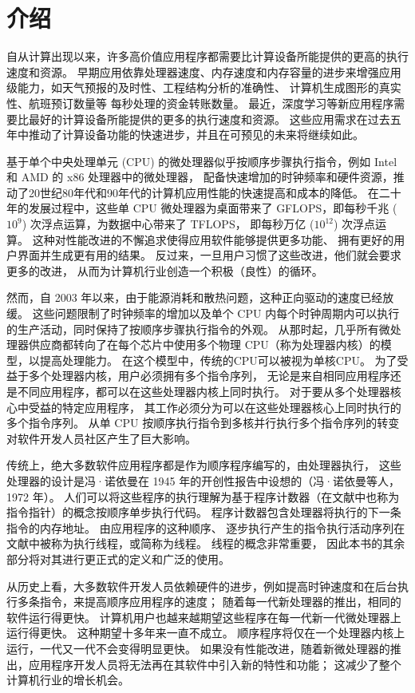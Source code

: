 \section{介绍}

自从计算出现以来，许多高价值应用程序都需要比计算设备所能提供的更高的执行速度和资源。 
早期应用依靠处理器速度、内存速度和内存容量的进步来增强应用级能力，如天气预报的及时性、工程结构分析的准确性、
计算机生成图形的真实性、航班预订数量等 每秒处理的资金转账数量。 
最近，深度学习等新应用程序需要比最好的计算设备所能提供的更多的执行速度和资源。 
这些应用需求在过去五年中推动了计算设备功能的快速进步，并且在可预见的未来将继续如此。

基于单个中央处理单元 (CPU) 的微处理器似乎按顺序步骤执行指令，例如 Intel 和 AMD 的 x86 处理器中的微处理器，
配备快速增加的时钟频率和硬件资源，推动了20世纪80年代和90年代的计算机应用性能的快速提高和成本的降低。 
在二十年的发展过程中，这些单 CPU 微处理器为桌面带来了 GFLOPS，即每秒千兆 ($10^9$) 次浮点运算，为数据中心带来了 TFLOPS，
即每秒万亿 ($10^{12}$) 次浮点运算。 这种对性能改进的不懈追求使得应用软件能够提供更多功能、
拥有更好的用户界面并生成更有用的结果。 反过来，一旦用户习惯了这些改进，他们就会要求更多的改进，
从而为计算机行业创造一个积极（良性）的循环。

然而，自 2003 年以来，由于能源消耗和散热问题，这种正向驱动的速度已经放缓。 
这些问题限制了时钟频率的增加以及单个 CPU 内每个时钟周期内可以执行的生产活动，同时保持了按顺序步骤执行指令的外观。 
从那时起，几乎所有微处理器供应商都转向了在每个芯片中使用多个物理 CPU（称为处理器内核）的模型，以提高处理能力。 
在这个模型中，传统的CPU可以被视为单核CPU。 为了受益于多个处理器内核，用户必须拥有多个指令序列，
无论是来自相同应用程序还是不同应用程序，都可以在这些处理器内核上同时执行。 对于要从多个处理器核心中受益的特定应用程序，
其工作必须分为可以在这些处理器核心上同时执行的多个指令序列。 
从单 CPU 按顺序执行指令到多核并行执行多个指令序列的转变对软件开发人员社区产生了巨大影响。

传统上，绝大多数软件应用程序都是作为顺序程序编写的，由处理器执行，
这些处理器的设计是冯·诺依曼在 1945 年的开创性报告中设想的（冯·诺依曼等人，1972 年）。 
人们可以将这些程序的执行理解为基于程序计数器（在文献中也称为指令指针）的概念按顺序单步执行代码。 
程序计数器包含处理器将执行的下一条指令的内存地址。 由应用程序的这种顺序、
逐步执行产生的指令执行活动序列在文献中被称为执行线程，或简称为线程。 线程的概念非常重要，
因此本书的其余部分将对其进行更正式的定义和广泛的使用。

从历史上看，大多数软件开发人员依赖硬件的进步，例如提高时钟速度和在后台执行多条指令，来提高顺序应用程序的速度； 
随着每一代新处理器的推出，相同的软件运行得更快。 计算机用户也越来越期望这些程序在每一代新一代微处理器上运行得更快。 
这种期望十多年来一直不成立。 顺序程序将仅在一个处理器内核上运行，一代又一代不会变得明显更快。 
如果没有性能改进，随着新微处理器的推出，应用程序开发人员将无法再在其软件中引入新的特性和功能； 
这减少了整个计算机行业的增长机会。

